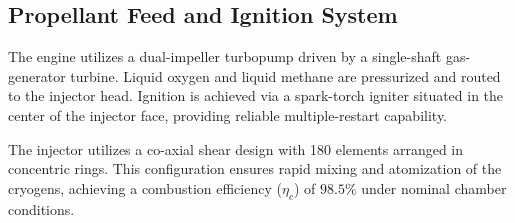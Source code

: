 \subsection{Propellant Feed and Ignition System}
The engine utilizes a dual-impeller turbopump driven by a single-shaft gas-generator turbine. Liquid oxygen and liquid methane are pressurized and routed to the injector head. Ignition is achieved via a spark-torch igniter situated in the center of the injector face, providing reliable multiple-restart capability.

The injector utilizes a co-axial shear design with 180 elements arranged in concentric rings. This configuration ensures rapid mixing and atomization of the cryogens, achieving a combustion efficiency ($\eta_c$) of $98.5\%$ under nominal chamber conditions.
